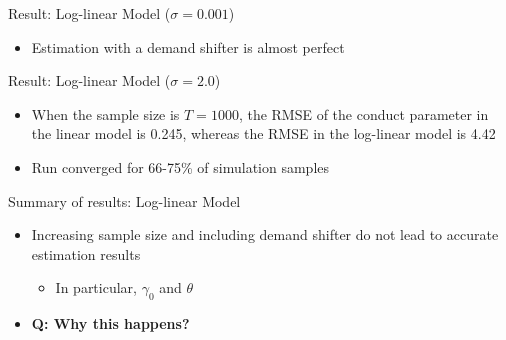 \documentclass[aspectratio = 169]{beamer}
\theoremstyle{definition}
\begin{document}
\begin{frame}{Result: Log-linear Model ($\sigma = 0.001$)}
        \begin{table}[]
        \centering
        \tiny
        \label{tab:loglinear_with_demand_001}
    \end{table}
    \begin{itemize}
        \item Estimation with a demand shifter is almost perfect
    \end{itemize}
\end{frame}


\begin{frame}{Result: Log-linear Model ($\sigma = 2.0$)}
        \begin{table}[]
        \centering
        \tiny
        \label{tab:loglinear_with_demand_2}
    \end{table}
    \begin{itemize}
        \item When the sample size is $T = 1000$, the RMSE of the conduct parameter in the  linear model is 0.245, whereas the RMSE in the log-linear model is 4.42
        \item Run converged for 66-75\% of simulation samples
    \end{itemize}
\end{frame}

\begin{frame}{Summary of results: Log-linear Model}
    \begin{itemize}
        \item Increasing sample size and including demand shifter do not lead to accurate estimation results
        \begin{itemize}
            \item In particular, $\gamma_0$ and $\theta$
        \end{itemize}
        \item \textbf{Q: Why this happens?}
    \end{itemize}
\end{frame}
\end{document}
